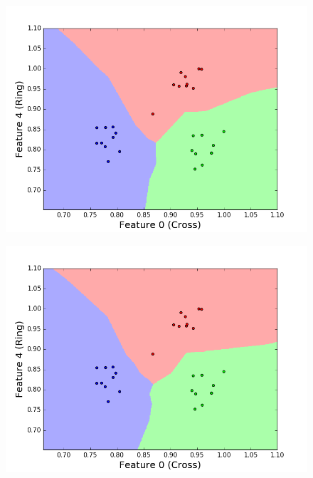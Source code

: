 \documentclass[11pt, a4paper]{article}
\begin{document}
\begin{figure}
\begin{minipage}[b]{.5\textwidth}
\centering
\includegraphics[width=1\textwidth]{training_plot_k1.png}
\label{fig:1a}
\end{minipage}%
\begin{minipage}[b]{.5\textwidth}
\centering
\includegraphics[width=1\textwidth]{training_plot_k2.png}
\label{fig:1a}
\end{minipage}
\begin{minipage}[b]{.5\textwidth}
\centering

\end{minipage}
\end{figure}
\end{document}
